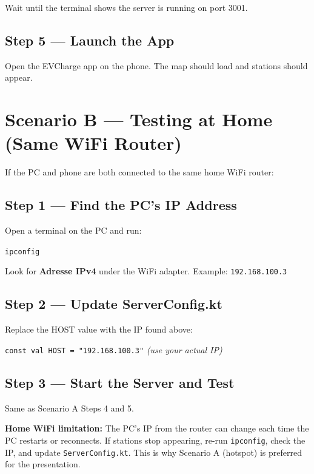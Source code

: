 \documentclass[12pt,a4paper]{article}
\begin{document}
Wait until the terminal shows the server is running on port 3001.

\subsection{Step 5 --- Launch the App}

Open the EVCharge app on the phone. The map should load and stations should appear.

\section{Scenario B --- Testing at Home (Same WiFi Router)}

If the PC and phone are both connected to the same home WiFi router:

\subsection{Step 1 --- Find the PC's IP Address}

Open a terminal on the PC and run:

\begin{codebox}
\texttt{ipconfig}
\end{codebox}

Look for \textbf{Adresse IPv4} under the WiFi adapter. Example: \texttt{192.168.100.3}

\subsection{Step 2 --- Update ServerConfig.kt}

Replace the HOST value with the IP found above:

\begin{codebox}
\texttt{const val HOST = "192.168.100.3"} \quad \textit{(use your actual IP)}
\end{codebox}

\subsection{Step 3 --- Start the Server and Test}

Same as Scenario A Steps 4 and 5.

\begin{warnbox}
\textbf{Home WiFi limitation:} The PC's IP from the router can change each time the PC
restarts or reconnects. If stations stop appearing, re-run \texttt{ipconfig}, check the
IP, and update \texttt{ServerConfig.kt}. This is why Scenario A (hotspot) is preferred
for the presentation.
\end{warnbox}
\end{document}
